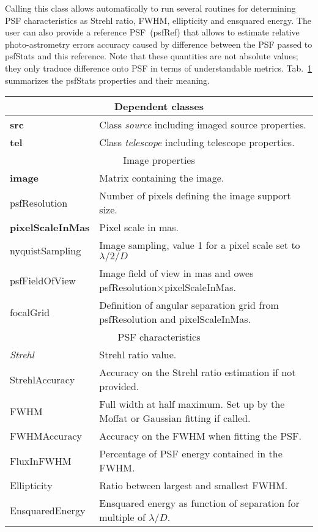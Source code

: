 \documentclass[12pt]{article}
\begin{document}
Calling this class allows automatically to run several routines for determining PSF characteristics as Strehl ratio, FWHM, ellipticity and ensquared energy. The user can also provide a reference PSF~(psfRef) that allows to estimate relative photo-astrometry errors accuracy caused by difference between the PSF passed to psfStats and this reference. Note that these quantities are not absolute values; they only traduce difference onto PSF in terms of understandable metrics.
Tab.~\ref{T:psfStats} summarizes the psfStats properties and their meaning.

\begin{table}[h!] \label{T:psfStats}
	\centering
	\begin{tabular}{lp{15cm}}
		\hline 
		\multicolumn{2}{c}{Dependent classes} \\
			\hline
	\textbf{src} & Class \emph{source} including imaged source properties.\\
	\textbf{tel}& Class \emph{telescope} including telescope properties.\\	
		\hline
		 \multicolumn{2}{c}{Image properties} \\
		 	\hline
	\textbf{image}& Matrix containing the image.\\	
	psfResolution& Number of pixels defining the image support size. \\
	\textbf{pixelScaleInMas}& Pixel scale in mas. \\
	nyquistSampling& Image sampling, value 1 for a pixel scale set to $\lambda/2/D$\\
	psfFieldOfView& Image field of view in mas and owes psfResolution$\times$pixelScaleInMas. \\
	focalGrid& Definition of angular separation grid from psfResolution and pixelScaleInMas. \\
	\hline
	 \multicolumn{2}{c}{PSF characteristics} \\
	\hline
	\emph{Strehl}& Strehl ratio value.\\
	StrehlAccuracy& Accuracy on the Strehl ratio estimation if not provided.\\
	FWHM& Full width at half maximum. Set up by the Moffat or Gaussian fitting if called.\\
	FWHMAccuracy& Accuracy on the FWHM when fitting the PSF.\\
	FluxInFWHM& Percentage of PSF energy contained in the FWHM.\\
	Ellipticity& Ratio between largest and smallest FWHM.\\
	EnsquaredEnergy& Ensquared energy as function of separation for multiple of $\lambda/D$.\\                

\end{tabular}
\end{table}
\end{document}

